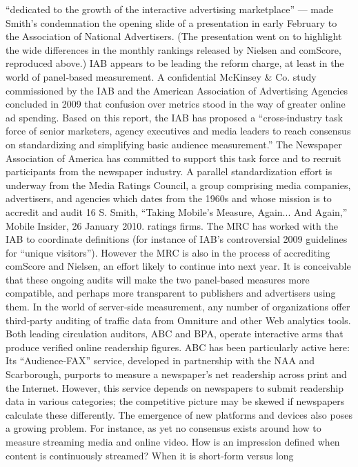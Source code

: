 ``dedicated to the growth of the interactive advertising marketplace'' —
made Smith’s condemnation the opening slide of a presentation in early
February to the Association of National Advertisers. (The presentation
went on to highlight the wide differences in the monthly rankings
released by Nielsen and comScore, reproduced above.)
IAB appears to be leading the reform charge, at least in the world of
panel‐based measurement. A confidential McKinsey & Co. study
commissioned by the IAB and the American Association of Advertising
Agencies concluded in 2009 that confusion over metrics stood in the way
of greater online ad spending. Based on this report, the IAB has proposed
a ``cross‐industry task force of senior marketers, agency executives and
media leaders to reach consensus on standardizing and simplifying basic
audience measurement.'' The Newspaper Association of America has
committed to support this task force and to recruit participants from the
newspaper industry.
A parallel standardization effort is underway from the Media Ratings
Council, a group comprising media companies, advertisers, and agencies
which dates from the 1960s and whose mission is to accredit and audit
16 S. Smith, ``Taking Mobile's Measure, Again... And Again,'' Mobile Insider, 26
January 2010.
ratings firms. The MRC has worked with the IAB to coordinate definitions
(for instance of IAB’s controversial 2009 guidelines for ``unique visitors'').
However the MRC is also in the process of accrediting comScore and
Nielsen, an effort likely to continue into next year. It is conceivable that
these ongoing audits will make the two panel‐based measures more
compatible, and perhaps more transparent to publishers and advertisers
using them.
In the world of server‐side measurement, any number of organizations
offer third‐party auditing of traffic data from Omniture and other Web
analytics tools. Both leading circulation auditors, ABC and BPA, operate
interactive arms that produce verified online readership figures. ABC has
been particularly active here: Its ``Audience‐FAX'' service, developed in
partnership with the NAA and Scarborough, purports to measure a
newspaper’s net readership across print and the Internet. However, this
service depends on newspapers to submit readership data in various
categories; the competitive picture may be skewed if newspapers calculate
these differently.
The emergence of new platforms and devices also poses a growing
problem. For instance, as yet no consensus exists around how to measure
streaming media and online video. How is an impression defined when
content is continuously streamed? When it is short‐form versus long
